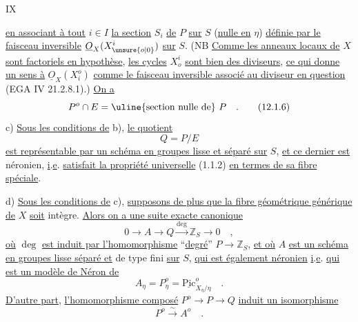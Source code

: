 \hfill IX

\uline{en associant à tout} $i\in I$ \uline{la section} $S_i$ \uline{de} $P$ \uline{sur} $S$ (\uline{nulle en} $\eta$) \uline{définie par le faisceau inversible} $\underline O_X(X_{\unsure{o|0}}^i)$ \uline{sur} $S$. (NB \uline{Comme les anneaux locaux de} $X$ \uline{sont factoriels en hypothèse}, \uline{les cycles} $X_o^i$ \uline{sont bien des diviseurs}, \uline{ce qui donne un sens à} $\underline O_X(X_i^o)$ \uline{comme le faisceau inversible associé au diviseur en question} (EGA IV 21.2.8.1).) \uline{On a}
\[
 P^o\cap E=\text{\uline{section nulle de} }P\quad .\tag*{(12.1.6)}
\]
c) \uline{Sous les conditions de} b), \uline{le quotient}
\[
 Q=P/E\tag*{(12.1.7)}
\]
\uline{est représentable par un schéma en groupes lisse et séparé sur} $S$, \uline{et ce dernier est} néronien, \uline{i}.\uline{e}. \uline{satisfait la propriété universelle} (1.1.2) \uline{en termes de sa fibre spéciale}.

d) \uline{Sous les conditions de} c), \uline{supposons de plus que la fibre géométrique générique de} $X$ \uline{soit} intègre. \uline{Alors on a une suite exacte canonique}
\[
 0\longrightarrow A\longrightarrow Q\xrightarrow{\deg}\mathbb{Z}_S\longrightarrow 0\quad ,\tag*{(12.1.8)}
\]
\uline{où} $\deg$ \uline{est induit par l'homomorphisme} ``\uline{degré}'' $P\longrightarrow\mathbb{Z}_S$, \uline{et où} $A$ \uline{est un schéma en groupes lisse séparé et} de type fini \uline{sur} $S$, \uline{qui est également néronien} \uline{i}.\uline{e}. \uline{qui est un modèle de Néron de}
\[
 A_\eta=P_\eta^o=\underline{\mathrm{Pic}}_{X_\eta/\eta}^{o}\quad .\tag*{(12.1.9)}
\]
\uline{D'autre part}, \uline{l'homomorphisme composé} $P^o\longrightarrow P\to Q$ \uline{induit un isomorphisme}
\[
 P^o\xrightarrow{\sim}A^o\quad .\tag*{(12.1.10)}
\]

